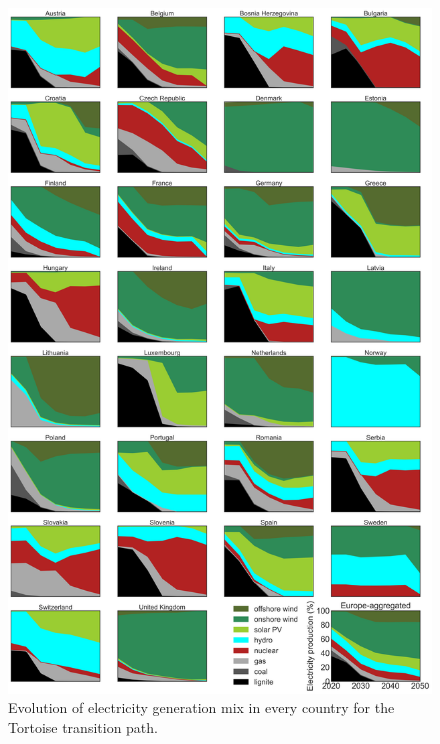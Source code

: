 \documentclass[3p]{elsarticle} %
\begin{document}
\begin{figure}[!h]
\centering
\includegraphics[width=0.8\columnwidth]{figures/electricity_production_w_TYNDP_go.png}
\caption{Evolution of electricity generation mix in every country for the Tortoise transition path.} \label{fig_primary_energy} 
\end{figure}

\end{document}
